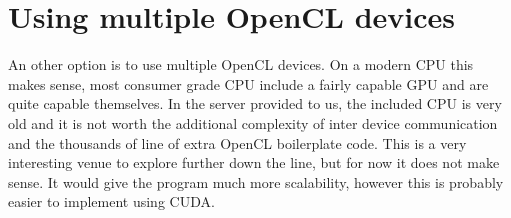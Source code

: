 \documentclass[final]{report}
\begin{document}
\section{Using multiple OpenCL devices}
An other option is to use multiple OpenCL devices.
On a modern CPU this makes sense, most consumer grade CPU include a fairly capable GPU and are quite capable themselves.
In the server provided to us, the included CPU is very old and it is not worth the additional complexity of inter device communication and the thousands of line of extra OpenCL boilerplate code.
This is a very interesting venue to explore further down the line, but for now it does not make sense.
It would give the program much more scalability, however this is probably easier to implement using CUDA.
\end{document}
